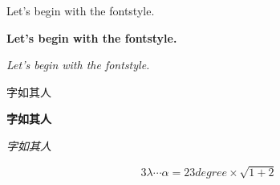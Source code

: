 \documentclass[no-math]{ctexart}
\begin{document}
    
    Let's begin with the fontstyle.\par
    \textbf{Let's begin with the fontstyle.}\par
    \textit{Let's begin with the fontstyle.}\par
    字如其人\par
    \textbf{字如其人}\par
    \textit{字如其人}\par
    \begin{equation}
        3\lambda \cdots \alpha = 23 degree \times \sqrt{1+2}
    \end{equation}
\end{document}
